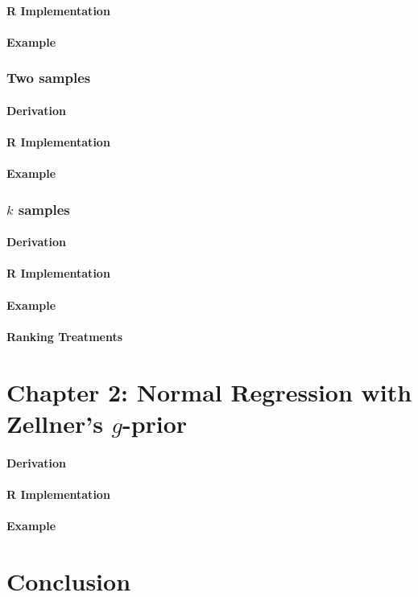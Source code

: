 \documentclass[12pt, a4paper]{article}
\begin{document}
      \paragraph{R Implementation}
      \paragraph{Example}
    \subsubsection{Two samples}
      \paragraph{Derivation}
      \paragraph{R Implementation}
      \paragraph{Example}
    \subsubsection{$k$ samples}
      \paragraph{Derivation}
      \paragraph{R Implementation}
      \paragraph{Example}
      \paragraph{Ranking Treatments}

\clearpage


\section{Chapter 2:  Normal Regression with Zellner's $g$-prior}
  \paragraph{Derivation}
  \paragraph{R Implementation}
  \paragraph{Example}


\clearpage

\section{Conclusion}
\end{document}
